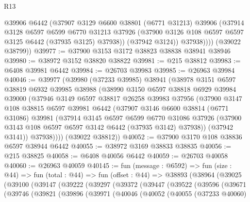 \begin{lexlean}{R13}
\begin{coremodule}
              @39906
              @6442
              (@37907
                @3129
                @6600
                @38801
                (@6771 @31213)
                @39906
                (@37914
                  @3128
                  @6597
                  @6599
                  @6770
                  @31213
                  @37926
                  (@37900 @3126 @108 @6597 @6597 @3125 @6442 (@37935 @3125) @37938))
                (@37942 @3124))
              @37938))))
      (@39022 @38799))
@39977 := @37900 @3153 @3172 @38823 @38838 @38941 @38946
@39980 := @38972 @3152 @38820 @38822
@39981 := @215 @38812
@39983 := @6408 @39981 @6442
@39984 := @26703 @39983
@39985 := @26963 @39984
@40046 := @39977
    (@39980
      (@37233 @39985)
      @38941
      (@38978
        @3151
        @6597
        @38819
        @6932
        @39985
        @38988
        (@38990
          @3150
          @6597
          @38818
          @6929
          @39984
          @39000
          (@37946
            @3149
            @6597
            @38817
            @26258
            @39983
            @37956
            (@37900
              @3147
              @108
              @38815
              @6597
              @39981
              @6442
              (@37907
                @3146
                @6600
                @38814
                (@6771 @31086)
                @39981
                (@37914
                  @3145
                  @6597
                  @6599
                  @6770
                  @31086
                  @37926
                  (@37900 @3143 @108 @6597 @6597 @3142 @6442 (@37935 @3142) @37938))
                (@37942 @3141))
              @37938))))
      (@39022 @38812))
@40052 := @37900 @3170 @108 @38836 @6597 @38944 @6442
@40055 := @38972 @3169 @38833 @38835
@40056 := @215 @38825
@40058 := @6408 @40056 @6442
@40059 := @26703 @40058
@40060 := @26963 @40059
@40145 := fun (message : @6592) =>
  fun (size : @44) =>
  fun (total : @44) =>
  fun (offset : @44) =>
  @38893
    (@38964
      (@39025
        (@39100
          (@39147
            (@39222
              (@39297
                (@39372
                  (@39447
                    (@39522
                      (@39596
                        (@39671
                          (@39746
                            (@39821
                              (@39896
                                (@39971
                                  (@40046
                                    (@40052
                                      (@40055
                                        (@37233 @40060)

\end{coremodule}
\end{lexlean}
